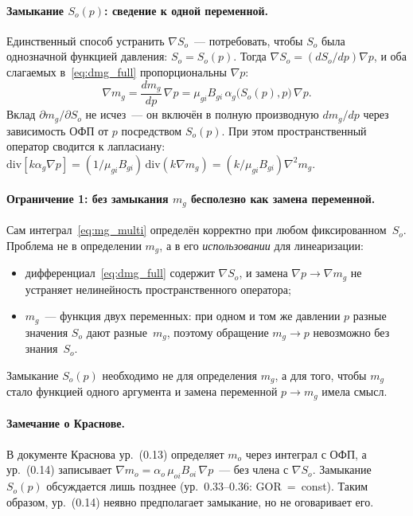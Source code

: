 \documentclass[12pt,a4paper]{article}
\begin{document}
\paragraph{Замыкание $S_o(p)$: сведение к одной переменной.}
Единственный способ устранить $\nabla S_o$~--- потребовать,
чтобы $S_o$ была однозначной функцией давления:
$S_o = S_o(p)$. Тогда $\nabla S_o = (dS_o/dp)\nabla p$,
и оба слагаемых в~\eqref{eq:dmg_full} пропорциональны
$\nabla p$:
\begin{equation}\label{eq:dmg_closure}
  \nabla m_g = \frac{dm_g}{dp}\,\nabla p
  = \mu_{gi}B_{gi}\,\alpha_g\bigl(S_o(p),p\bigr)\,\nabla p.
\end{equation}
Вклад $\partial m_g/\partial S_o$ не исчез~---
он включён в полную производную $dm_g/dp$
через зависимость ОФП от $p$ посредством $S_o(p)$.
При этом пространственный оператор сводится к лапласиану:
$\mathrm{div}[k\alpha_g\nabla p]
= (1/\mu_{gi}B_{gi})\,\mathrm{div}(k\nabla m_g)
= (k/\mu_{gi}B_{gi})\nabla^2 m_g$.

\paragraph{Ограничение 1: без замыкания $m_g$ бесполезно
как замена переменной.}
Сам интеграл~\eqref{eq:mg_multi} определён корректно
при любом фиксированном~$S_o$. Проблема не в определении
$m_g$, а в его \emph{использовании} для линеаризации:
\begin{itemize}[nosep]
  \item дифференциал~\eqref{eq:dmg_full} содержит $\nabla S_o$,
        и замена $\nabla p \to \nabla m_g$ не устраняет
        нелинейность пространственного оператора;
  \item $m_g$~--- функция двух переменных:
        при одном и том же давлении $p$ разные значения
        $S_o$ дают разные~$m_g$, поэтому обращение
        $m_g \to p$ невозможно без знания~$S_o$.
\end{itemize}
Замыкание $S_o(p)$ необходимо не для определения $m_g$,
а для того, чтобы $m_g$ стало функцией одного аргумента
и замена переменной $p \to m_g$ имела смысл.

\paragraph{Замечание о Краснове.}
В документе Краснова ур.~(0.13) определяет $m_o$ через
интеграл с ОФП, а ур.~(0.14) записывает
$\nabla m_o = \alpha_o\,\mu_{oi}B_{oi}\,\nabla p$~---
без члена с $\nabla S_o$.
Замыкание $S_o(p)$ обсуждается лишь позднее
(ур.~0.33--0.36: GOR~=~const). Таким образом, ур.~(0.14)
неявно предполагает замыкание, но не оговаривает его.
\end{document}

